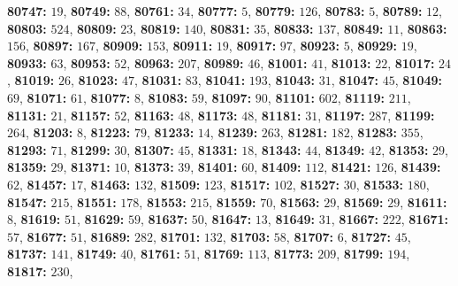 \textsf{\bfseries 80747:} $19$, \textsf{\bfseries 80749:} $88$, \textsf{\bfseries 80761:} $34$, \textsf{\bfseries 80777:} $5$, \textsf{\bfseries 80779:} $126$, \textsf{\bfseries 80783:} $5$, \textsf{\bfseries 80789:} $12$, \textsf{\bfseries 80803:} $524$, \textsf{\bfseries 80809:} $23$, \textsf{\bfseries 80819:} $140$, \textsf{\bfseries 80831:} $35$, \textsf{\bfseries 80833:} $137$, \textsf{\bfseries 80849:} $11$, \textsf{\bfseries 80863:} $156$, \textsf{\bfseries 80897:} $167$, \textsf{\bfseries 80909:} $153$, \textsf{\bfseries 80911:} $19$, \textsf{\bfseries 80917:} $97$, \textsf{\bfseries 80923:} $5$, \textsf{\bfseries 80929:} $19$, \textsf{\bfseries 80933:} $63$, \textsf{\bfseries 80953:} $52$, \textsf{\bfseries 80963:} $207$, \textsf{\bfseries 80989:} $46$, \textsf{\bfseries 81001:} $41$, \textsf{\bfseries 81013:} $22$, \textsf{\bfseries 81017:} $24$, \textsf{\bfseries 81019:} $26$, \textsf{\bfseries 81023:} $47$, \textsf{\bfseries 81031:} $83$, \textsf{\bfseries 81041:} $193$, \textsf{\bfseries 81043:} $31$, \textsf{\bfseries 81047:} $45$, \textsf{\bfseries 81049:} $69$, \textsf{\bfseries 81071:} $61$, \textsf{\bfseries 81077:} $8$, \textsf{\bfseries 81083:} $59$, \textsf{\bfseries 81097:} $90$, \textsf{\bfseries 81101:} $602$, \textsf{\bfseries 81119:} $211$, \textsf{\bfseries 81131:} $21$, \textsf{\bfseries 81157:} $52$, \textsf{\bfseries 81163:} $48$, \textsf{\bfseries 81173:} $48$, \textsf{\bfseries 81181:} $31$, \textsf{\bfseries 81197:} $287$, \textsf{\bfseries 81199:} $264$, \textsf{\bfseries 81203:} $8$, \textsf{\bfseries 81223:} $79$, \textsf{\bfseries 81233:} $14$, \textsf{\bfseries 81239:} $263$, \textsf{\bfseries 81281:} $182$, \textsf{\bfseries 81283:} $355$, \textsf{\bfseries 81293:} $71$, \textsf{\bfseries 81299:} $30$, \textsf{\bfseries 81307:} $45$, \textsf{\bfseries 81331:} $18$, \textsf{\bfseries 81343:} $44$, \textsf{\bfseries 81349:} $42$, \textsf{\bfseries 81353:} $29$, \textsf{\bfseries 81359:} $29$, \textsf{\bfseries 81371:} $10$, \textsf{\bfseries 81373:} $39$, \textsf{\bfseries 81401:} $60$, \textsf{\bfseries 81409:} $112$, \textsf{\bfseries 81421:} $126$, \textsf{\bfseries 81439:} $62$, \textsf{\bfseries 81457:} $17$, \textsf{\bfseries 81463:} $132$, \textsf{\bfseries 81509:} $123$, \textsf{\bfseries 81517:} $102$, \textsf{\bfseries 81527:} $30$, \textsf{\bfseries 81533:} $180$, \textsf{\bfseries 81547:} $215$, \textsf{\bfseries 81551:} $178$, \textsf{\bfseries 81553:} $215$, \textsf{\bfseries 81559:} $70$, \textsf{\bfseries 81563:} $29$, \textsf{\bfseries 81569:} $29$, \textsf{\bfseries 81611:} $8$, \textsf{\bfseries 81619:} $51$, \textsf{\bfseries 81629:} $59$, \textsf{\bfseries 81637:} $50$, \textsf{\bfseries 81647:} $13$, \textsf{\bfseries 81649:} $31$, \textsf{\bfseries 81667:} $222$, \textsf{\bfseries 81671:} $57$, \textsf{\bfseries 81677:} $51$, \textsf{\bfseries 81689:} $282$, \textsf{\bfseries 81701:} $132$, \textsf{\bfseries 81703:} $58$, \textsf{\bfseries 81707:} $6$, \textsf{\bfseries 81727:} $45$, \textsf{\bfseries 81737:} $141$, \textsf{\bfseries 81749:} $40$, \textsf{\bfseries 81761:} $51$, \textsf{\bfseries 81769:} $113$, \textsf{\bfseries 81773:} $209$, \textsf{\bfseries 81799:} $194$, \textsf{\bfseries 81817:} $230$, 
